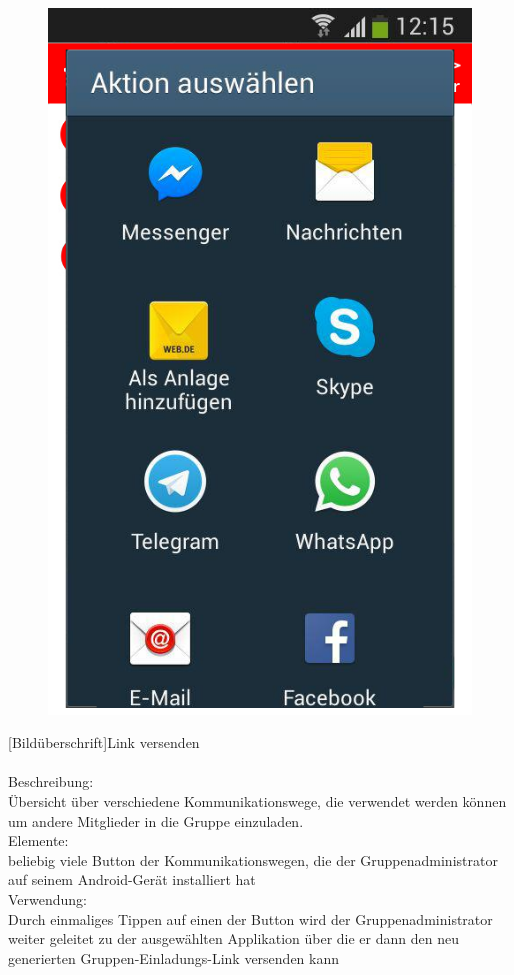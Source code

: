 \begin{figure}
	\includegraphics[scale =1]{resources/images/link_versenden.png}
\end{figure}
[Bildüberschrift]Link versenden\\ \\
[Kleinüberschrift]Beschreibung:\\
Übersicht über verschiedene Kommunikationswege, die verwendet werden können um andere Mitglieder in die Gruppe einzuladen.\\
[Kleinüberschrift]Elemente:\\
beliebig viele Button der Kommunikationswegen, die der Gruppenadministrator auf seinem Android-Gerät installiert hat\\
[Kleinüberschrift]Verwendung:\\
Durch einmaliges Tippen auf einen der Button wird der Gruppenadministrator weiter geleitet zu der ausgewählten Applikation über die er dann den neu generierten Gruppen-Einladungs-Link versenden kann\\ \\

